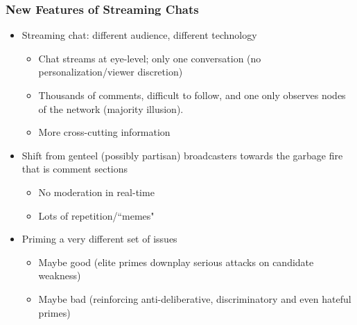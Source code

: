 \documentclass{beamer}
\begin{document}
\begin{frame}
\frametitle{New Features of Streaming Chats}
\pause 
\vspace{3mm}
\begin{itemize}
\item Streaming chat: different audience, different technology
    \pause 
      \begin{itemize}
        \item Chat streams at eye-level; only one conversation (no personalization/viewer discretion)
        \item Thousands of comments, difficult to follow, and one only observes nodes of the network (majority illusion). 
        \item More cross-cutting information
        \pause 
    \end{itemize}
        \vspace{3mm}
        \pause
\item Shift from genteel (possibly partisan) broadcasters towards the garbage fire that is comment sections
    \pause 
      \begin{itemize}
        \item No moderation in real-time \pause
        \item Lots of repetition/``memes"  \pause 
\end{itemize}
        \pause

        \vspace{3mm}
    \item Priming a very different set of issues
      \begin{itemize}
        \item Maybe good (elite primes downplay serious attacks on candidate weakness)
        \item Maybe bad (reinforcing anti-deliberative, discriminatory and even hateful primes)
    \end{itemize}
        \pause 

\end{itemize}

\end{frame}
\end{document}
